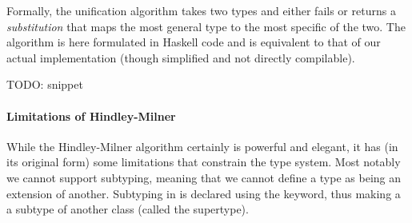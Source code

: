 Formally, the unification algorithm takes two types and either fails or returns a \emph{substitution} that maps the most general type to the most specific of the two. The algorithm is here formulated in Haskell code and is equivalent to that of our actual implementation (though simplified and not directly compilable).

TODO: snippet
%
%
%
%
%
%
%
%
%

\paragraph{Limitations of Hindley-Milner}
While the Hindley-Milner algorithm certainly is powerful and elegant, it has (in its original form) some limitations that constrain the type system. Most notably we cannot support subtyping, meaning that we cannot define a type as being an extension of another. Subtyping in  is declared using the  keyword, thus making a  a subtype of another class (called the supertype).

